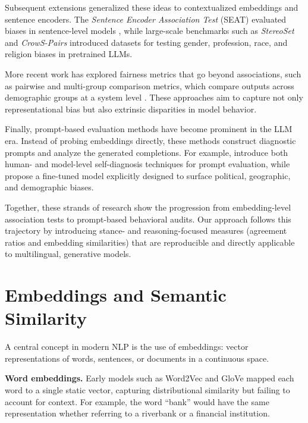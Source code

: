 Subsequent extensions generalized these ideas to contextualized embeddings and sentence encoders. The \emph{Sentence Encoder Association Test} (SEAT) evaluated biases in sentence-level models \parencite{may2019seat}, while large-scale benchmarks such as \emph{StereoSet} \parencite{stereoset2021} and \emph{CrowS-Pairs} \parencite{crows2020pairs} introduced datasets for testing gender, profession, race, and religion biases in pretrained LLMs.  

More recent work has explored fairness metrics that go beyond associations, such as pairwise and multi-group comparison metrics, which compare outputs across demographic groups at a system level \parencite{quantifying2021}. These approaches aim to capture not only representational bias but also extrinsic disparities in model behavior.  

Finally, prompt-based evaluation methods have become prominent in the LLM era. Instead of probing embeddings directly, these methods construct diagnostic prompts and analyze the generated completions. For example, \textcite{detecting2023} introduce both human- and model-level self-diagnosis techniques for prompt evaluation, while \textcite{opiniongpt2023} propose a fine-tuned model explicitly designed to surface political, geographic, and demographic biases.  

Together, these strands of research show the progression from embedding-level association tests to prompt-based behavioral audits. Our approach follows this trajectory by introducing stance- and reasoning-focused measures (agreement ratios and embedding similarities) that are reproducible and directly applicable to multilingual, generative models.



\section{Embeddings and Semantic Similarity}

A central concept in modern NLP is the use of embeddings: vector representations of words, sentences, or documents in a continuous space.  

\textbf{Word embeddings.} Early models such as Word2Vec \parencite{mikolov2013word2vec} and GloVe \parencite{pennington2014glove} mapped each word to a single static vector, capturing distributional similarity but failing to account for context. For example, the word ``bank'' would have the same representation whether referring to a riverbank or a financial institution.  

